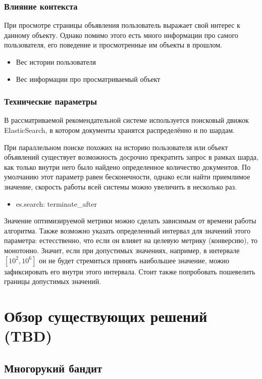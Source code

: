 \documentclass{article}
\begin{document}
\subsubsection{Влияние контекста}
При просмотре страницы объявления пользователь выражает свой интерес к данному объекту. Однако помимо этого есть много информации про самого пользователя, его поведение и просмотренные им объекты в прошлом.

\begin{itemize}  
\item Вес истории пользователя
\item Вес информации про просматриваемый объект
\end{itemize}


\subsubsection{Технические параметры}
В рассматриваемой рекомендательной системе используется поисковый движок ElasticSearch, в котором документы хранятся распределённо и по шардам. 
\par
При параллельном поиске похожих на историю пользователя или объект объявлений существует возможность досрочно прекратить запрос в рамках шарда, как только внутри него было найдено определенное количество документов. По умолчанию этот параметр равен бесконечности, однако если найти приемлимое значение, скорость работы всей системы можно увеличить в несколько раз. 

\begin{itemize}  
\item es.search: terminate\_after
\end{itemize}

\par
Значение оптимизируемой метрики можно сделать зависимым от времени работы алгоритма. Также возможно указать определенный интервал для значений этого параметра: естесственно, что если он влияет на целевую метрику (конверсию), то монотонно. Значит, если при допустимых значениях, например, в интервале $[10^2, 10^6]$ он не будет стремиться принять наибольшее значение, можно зафиксировать его внутри этого интервала. Стоит также попробовать пошевелить границы допустимых значений.



\section{Обзор существующих решений (TBD)}
\subsection{Многорукий бандит}
\end{document}
